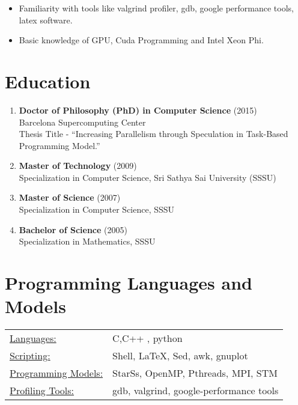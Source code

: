 \documentclass[margin]{res}
\begin{document}
\begin{resume}
\begin{itemize}
	   \item Familiarity with tools like valgrind profiler, gdb, google performance tools, latex software.
%
	   \item Basic knowledge of GPU, Cuda Programming and Intel Xeon Phi.
%
  \end{itemize}

\section{Education}
%
\begin{enumerate}
	   \item {\bf Doctor of Philosophy (PhD)  in Computer Science } (2015) \\
		Barcelona Supercomputing Center \\
		Thesis Title - \enquote{Increasing Parallelism through Speculation in Task-Based Programming Model.}\\
%
	   \item {\bf Master of Technology }(2009) \\
		Specialization in Computer Science, Sri Sathya Sai University (SSSU) \\
%
	   \item {\bf Master of Science }(2007) \\
		Specialization in Computer Science, SSSU
%
	   \item {\bf Bachelor of Science} (2005) \\
		Specialization in Mathematics, SSSU
%
\end{enumerate}

\section{Programming Languages and Models}
   \begin{tabular}{l p{3in}}
	\underline{Languages:} & C\smallskip ,C++ \smallskip, python \smallskip \\
	\underline{Scripting:} & Shell\smallskip, LaTeX\smallskip , Sed\smallskip, awk\smallskip, gnuplot\\
	\underline{Programming Models:} & StarSs\smallskip, OpenMP\smallskip, Pthreads\smallskip, MPI\smallskip, STM\\
    \underline{Profiling Tools:} &gdb, valgrind\smallskip, google-performance tools\smallskip \\
 \end{tabular}
%

\end{resume}
\end{document}
